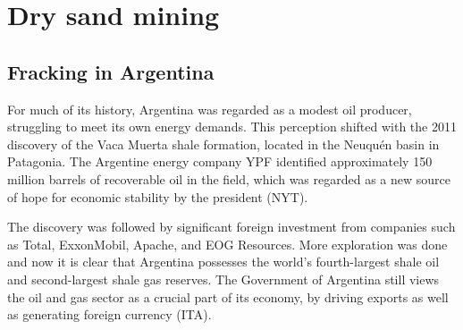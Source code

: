 \chapter{Dry sand mining}



\section{Fracking in Argentina}
For much of its history, Argentina was regarded as a modest oil producer, struggling to meet its own energy demands. This perception shifted with the 2011 discovery of the Vaca Muerta shale formation, located in the Neuquén basin in Patagonia. The Argentine energy company YPF identified approximately 150 million barrels of recoverable oil in the field, which was regarded as a new source of hope for economic stability by the president (NYT).

The discovery was followed by significant foreign investment from companies such as Total, ExxonMobil, Apache, and EOG Resources. More exploration was done and now it is clear that Argentina possesses the world’s fourth-largest shale oil and second-largest shale gas reserves. The Government of Argentina still views the oil and gas sector as a crucial part of its economy, by driving exports as well as generating foreign currency (ITA).

